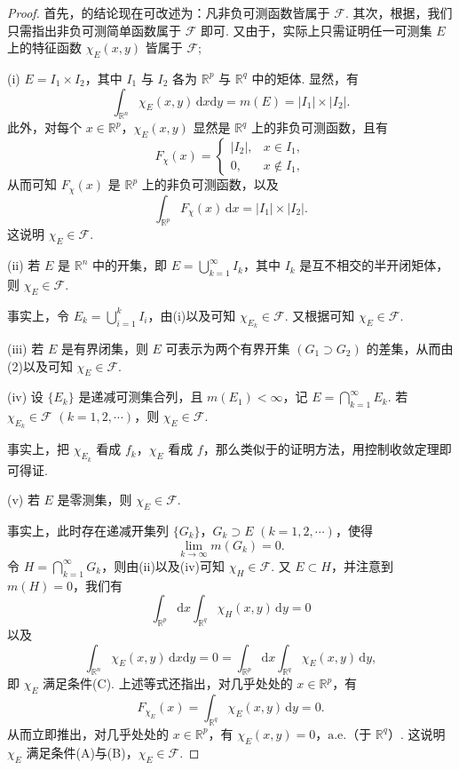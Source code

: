 \documentclass[../../main.tex]{subfiles}%
\begin{document}
\begin{proof}
首先，的结论现在可改述为：凡非负可测函数皆属于 \( \mathcal{F} \). 其次，根据，我们只需指出非负可测简单函数属于 \( \mathcal{F} \) 即可. 又由于，实际上只需证明任一可测集 \( E \) 上的特征函数 \( \chi_E(x, y) \) 皆属于 \( \mathcal{F} \);

(i) \( E = I_1 \times I_2 \)，其中 \( I_1 \) 与 \( I_2 \) 各为 \( \mathbb{R}^p \) 与 \( \mathbb{R}^q \) 中的矩体. 显然，有
\[
\int_{\mathbb{R}^n} \chi_E(x, y) \, \mathrm{d}x\mathrm{d}y = m(E) = |I_1| \times |I_2|.
\]
此外，对每个 \( x \in \mathbb{R}^p \)，\( \chi_E(x, y) \) 显然是 \( \mathbb{R}^q \) 上的非负可测函数，且有
\[
F_{\chi}(x) = 
\begin{cases} 
|I_2|, & x \in I_1, \\
0, & x \notin I_1,
\end{cases}
\]
从而可知 \( F_{\chi}(x) \) 是 \( \mathbb{R}^p \) 上的非负可测函数，以及
\[
\int_{\mathbb{R}^p} F_{\chi}(x) \, \mathrm{d}x = |I_1| \times |I_2|.
\]
这说明 \( \chi_E \in \mathcal{F} \).

(ii) 若 \( E \) 是 \( \mathbb{R}^n \) 中的开集，即 \( E = \bigcup_{k = 1}^{\infty} I_k \)，其中 \( I_k \) 是互不相交的半开闭矩体，则 \( \chi_E \in \mathcal{F} \).

事实上，令 \( E_k = \bigcup_{i = 1}^k I_i \)，由(i)以及可知 \( \chi_{E_k} \in \mathcal{F} \). 又根据可知 \( \chi_E \in \mathcal{F} \).

(iii) 若 \( E \) 是有界闭集，则 \( E \) 可表示为两个有界开集 \( (G_1 \supset G_2) \) 的差集，从而由(2)以及可知 \( \chi_E \in \mathcal{F} \).

(iv) 设 \( \{ E_k \} \) 是递减可测集合列，且 \( m(E_1) < \infty \)，记 \( E = \bigcap_{k = 1}^{\infty} E_k \). 若 \( \chi_{E_k} \in \mathcal{F} \) \( (k = 1, 2, \cdots) \)，则 \( \chi_E \in \mathcal{F} \).

事实上，把 \( \chi_{E_k} \) 看成 \( f_k \)，\( \chi_E \) 看成 \( f \)，那么类似于的证明方法，用控制收敛定理即可得证.

(v) 若 \( E \) 是零测集，则 \( \chi_E \in \mathcal{F} \).

事实上，此时存在递减开集列 \( \{ G_k \} \)，\( G_k \supset E \) \( (k = 1, 2, \cdots) \)，使得
\[
\lim_{k \to \infty} m(G_k) = 0.
\]
令 \( H = \bigcap_{k = 1}^{\infty} G_k \)，则由(ii)以及(iv)可知 \( \chi_H \in \mathcal{F} \). 又 \( E \subset H \)，并注意到 \( m(H) = 0 \)，我们有
\[
\int_{\mathbb{R}^p} \mathrm{d}x \int_{\mathbb{R}^q} \chi_H(x, y) \, \mathrm{d}y = 0
\]
以及
\[
\int_{\mathbb{R}^n} \chi_E(x, y) \, \mathrm{d}x\mathrm{d}y = 0 = \int_{\mathbb{R}^p} \mathrm{d}x \int_{\mathbb{R}^q} \chi_E(x, y) \, \mathrm{d}y,
\]
即 \( \chi_E \) 满足条件(C). 上述等式还指出，对几乎处处的 \( x \in \mathbb{R}^p \)，有
\[
F_{\chi_E}(x) = \int_{\mathbb{R}^q} \chi_E(x, y) \, \mathrm{d}y = 0.
\]
从而立即推出，对几乎处处的 \( x \in \mathbb{R}^p \)，有 \( \chi_E(x, y) = 0 \)，\(\text{a.e.}\)（于 \( \mathbb{R}^q \)）. 这说明 \( \chi_E \) 满足条件(A)与(B)，\( \chi_E \in \mathcal{F} \).


\end{proof}
\end{document}
